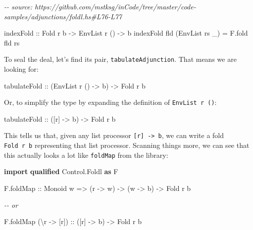 \documentclass[]{article}
\newenvironment{Shaded}{}{}
\newcommand{\CommentTok}[1]{\textcolor[rgb]{0.38,0.63,0.69}{\textit{#1}}}
\newcommand{\DataTypeTok}[1]{\textcolor[rgb]{0.56,0.13,0.00}{#1}}
\newcommand{\KeywordTok}[1]{\textcolor[rgb]{0.00,0.44,0.13}{\textbf{#1}}}
\newcommand{\NormalTok}[1]{#1}
\newcommand{\OtherTok}[1]{\textcolor[rgb]{0.00,0.44,0.13}{#1}}
\begin{document}
\begin{Shaded}
\begin{Highlighting}[]
\CommentTok{{-}{-} source: https://github.com/mstksg/inCode/tree/master/code{-}samples/adjunctions/foldl.hs\#L76{-}L77}

\OtherTok{indexFold ::} \DataTypeTok{Fold}\NormalTok{ r b }\OtherTok{{-}\textgreater{}} \DataTypeTok{EnvList}\NormalTok{ r () }\OtherTok{{-}\textgreater{}}\NormalTok{ b}
\NormalTok{indexFold fld (}\DataTypeTok{EnvList}\NormalTok{ rs \_) }\OtherTok{=}\NormalTok{ F.fold fld rs}
\end{Highlighting}
\end{Shaded}

To seal the deal, let's find its pair, \texttt{tabulateAdjunction}. That means
we are looking for:

\begin{Shaded}
\begin{Highlighting}[]
\OtherTok{tabulateFold ::}\NormalTok{ (}\DataTypeTok{EnvList}\NormalTok{ r () }\OtherTok{{-}\textgreater{}}\NormalTok{ b) }\OtherTok{{-}\textgreater{}} \DataTypeTok{Fold}\NormalTok{ r b}
\end{Highlighting}
\end{Shaded}

Or, to simplify the type by expanding the definition of \texttt{EnvList\ r\ ()}:

\begin{Shaded}
\begin{Highlighting}[]
\OtherTok{tabulateFold ::}\NormalTok{ ([r] }\OtherTok{{-}\textgreater{}}\NormalTok{ b) }\OtherTok{{-}\textgreater{}} \DataTypeTok{Fold}\NormalTok{ r b}
\end{Highlighting}
\end{Shaded}

This tells us that, given any list processor
\texttt{{[}r{]}\ -\textgreater{}\ b}, we can write a fold \texttt{Fold\ r\ b}
representing that list processor. Scanning things more, we can see that this
actually looks a lot like \texttt{foldMap} from the library:

\begin{Shaded}
\begin{Highlighting}[]
\KeywordTok{import} \KeywordTok{qualified} \DataTypeTok{Control.Foldl} \KeywordTok{as} \DataTypeTok{F}

\NormalTok{F.foldMap}
\OtherTok{    ::} \DataTypeTok{Monoid}\NormalTok{ w}
    \OtherTok{=\textgreater{}}\NormalTok{ (r }\OtherTok{{-}\textgreater{}}\NormalTok{ w)}
    \OtherTok{{-}\textgreater{}}\NormalTok{ (w }\OtherTok{{-}\textgreater{}}\NormalTok{ b)}
    \OtherTok{{-}\textgreater{}} \DataTypeTok{Fold}\NormalTok{ r b}

\CommentTok{{-}{-} or}

\NormalTok{F.foldMap (\textbackslash{}r }\OtherTok{{-}\textgreater{}}\NormalTok{ [r])}
\OtherTok{    ::}\NormalTok{ ([r] }\OtherTok{{-}\textgreater{}}\NormalTok{ b)}
    \OtherTok{{-}\textgreater{}} \DataTypeTok{Fold}\NormalTok{ r b}
\end{Highlighting}
\end{Shaded}
\end{document}
